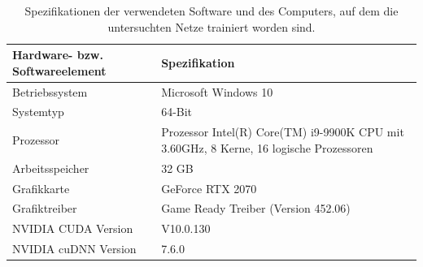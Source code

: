 \documentclass[12pt,a4paper,oneside,numbers=noenddot,headsepline,captions=tableheading,toc=bibliography,openany,tikz,margin=5mm]{scrbook}
\begin{document}
\begin{appendix}
\begin{table}[H]
\begin{center}
\begin{tabular}{|m{}<{\centering}|m{}<{\centering}|}
								
								\hline
							\end{tabular}
						\end{center}
						
						\label{fig: knotenmengen}
					\end{table}
				
					\begin{table}[H]
					\caption{Spezifikationen der verwendeten Software und des Computers, auf dem die untersuchten Netze trainiert worden sind.}
					\begin{center}
						
						\begin{tabular}{|m{}<{\centering}|m{}<{\centering}|}
							\hline
							
							Hardware- bzw. Softwareelement & Spezifikation  \\ \hline \hline
							Betriebssystem					&Microsoft Windows 10 \\ \cline{0-1}
							Systemtyp					&64-Bit			 \\ \cline{0-1}
							Prozessor					&Prozessor	Intel(R) Core(TM) i9-9900K CPU mit 3.60GHz, 8 Kerne, 16 logische Prozessoren 				 \\ \cline{0-1}
							Arbeitsspeicher			&32 GB		 \\ \cline{0-1} 
							Grafikkarte					&GeForce RTX 2070			 \\ \cline{0-1}
							Grafiktreiber					&Game Ready Treiber (Version 452.06)				 \\ \cline{0-1}
							NVIDIA CUDA Version				&V10.0.130 				 \\ \cline{0-1}
							NVIDIA cuDNN Version				&7.6.0	 \\ 
							
							
							\hline
						\end{tabular}
					\end{center}
					
					\label{fig: pcinfo}
				\end{table}
				

\end{appendix}
\end{document}
